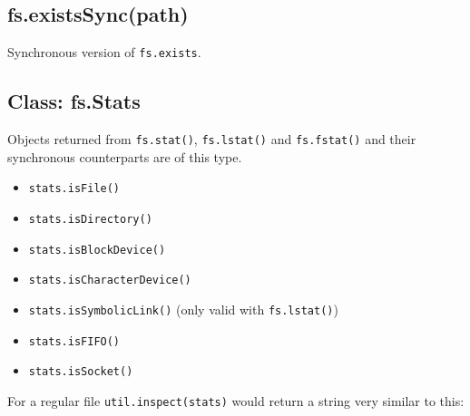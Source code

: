 \subsection{fs.existsSync(path)}

Synchronous version of \texttt{fs.exists}.

\subsection{Class: fs.Stats}

Objects returned from \texttt{fs.stat()}, \texttt{fs.lstat()} and
\texttt{fs.fstat()} and their synchronous counterparts are of this type.

\begin{itemize}
\item
  \texttt{stats.isFile()}
\item
  \texttt{stats.isDirectory()}
\item
  \texttt{stats.isBlockDevice()}
\item
  \texttt{stats.isCharacterDevice()}
\item
  \texttt{stats.isSymbolicLink()} (only valid with \texttt{fs.lstat()})
\item
  \texttt{stats.isFIFO()}
\item
  \texttt{stats.isSocket()}
\end{itemize}

For a regular file \texttt{util.inspect(stats)} would return a string
very similar to this:

\begin{Shaded}
\begin{Highlighting}[]
\NormalTok{\{ }\NormalTok{: }\NormalTok{,}
  \NormalTok{: }\NormalTok{,}
  \NormalTok{: }\NormalTok{,}
  \NormalTok{: }\NormalTok{,}
  \NormalTok{: }\NormalTok{,}
  \NormalTok{: }\NormalTok{,}
  \NormalTok{: }\NormalTok{,}
  \NormalTok{: }\NormalTok{,}
  \NormalTok{: }\NormalTok{,}
  \NormalTok{: }\NormalTok{,}
    \NormalTok{:}\NormalTok{:} 
    \NormalTok{:}\NormalTok{:} 
    \NormalTok{:}\NormalTok{:} 
\end{Highlighting}
\end{Shaded}

